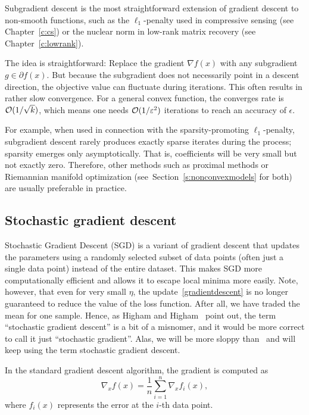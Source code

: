 Subgradient descent is the most straightforward extension of gradient descent to non-smooth functions, such as the $\ell_1$-penalty used in compressive sensing (see Chapter~\ref{c:cs}) or the nuclear norm in low-rank matrix recovery (see Chapter~\ref{c:lowrank}).

The idea is straightforward: Replace the gradient $\nabla f(x)$ with any subgradient $g \in \partial f(x)$.
But because the subgradient does not necessarily point in a descent direction, the objective value can fluctuate  during iterations. This often results in rather slow convergence. For a general convex function, the converges  rate is $\mathcal{O}(1/\sqrt{k})$, which means one needs $\mathcal{O}(1/\varepsilon^2)$ iterations to reach an accuracy of $\epsilon$.

For example, when used in connection with the sparsity-promoting $\ell_1$-penalty, subgradient descent rarely produces exactly sparse iterates during the process; sparsity emerges only asymptotically. That is, coefficients will be very small but not exactly zero. Therefore, other methods such as proximal methods or Riemannian manifold optimization (see~Section~\ref{s:nonconvexmodels} for both) are usually preferable in practice.


\subsection{Stochastic gradient descent}\label{s:gd:stochasticGD}




Stochastic Gradient Descent (SGD) is a variant of gradient descent that updates the parameters using a randomly selected subset of data points (often just a single data point) instead of the entire dataset. This makes SGD more computationally efficient and allows it to escape local minima more easily. Note, however, that even for very small $\eta$, the update~\eqref{gradientdescent} is no longer guaranteed to reduce the value of the loss function. After all, we have traded
the mean for one sample. Hence, as Higham and Higham~\cite{higham2019deep} point out, the term ``stochastic gradient descent'' is a bit of a misnomer, and it would be more correct to call it just ``stochastic gradient''. Alas, we will be more sloppy than~\cite{higham2019deep} and will keep using the term stochastic gradient descent.

In the standard gradient descent algorithm, the gradient is computed as
$$
\nabla_x f(x) = \frac{1}{n} \sum_{i=1}^{n} \nabla_x f_i(x),
$$
where $f_i(x)$ represents the error at the $ i $-th data point.

